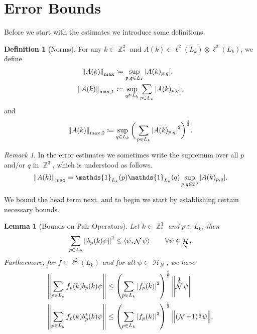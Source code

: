 \documentclass[sn-mathphys, Numbered ,a4paper]{sn-jnl}%
\DeclareMathOperator{\Z}{\mathbb{Z}}
\DeclareMathOperator{\HH}{\mathcal{H}}
\DeclareMathOperator{\NN}{\mathcal{N}}
\newcommand{\half}{\frac{1}{2}}
\newcommand{\eva}[1]{\left\langle #1 \right\rangle}
\theoremstyle{plain}
\newtheorem{lemma}[theorem]{Lemma}
\theoremstyle{definition}
\newtheorem{definition}[theorem]{Definition}
\theoremstyle{remark}
\newtheorem{remark}[theorem]{Remark}
\theoremstyle{plain}
\theoremstyle{definition}
\theoremstyle{remark}
\begin{document}
\section{Error Bounds}\label{subsec3}
 Before we start with the estimates we introduce some definitions.
\begin{definition}[Norms]
	For any $k \in \Z^3_*$ and $A(k)\in \ell^2(L_k)\otimes \ell^2(L_k)$, we define
	\begin{align}
		\norm{A(k)}_{\mathrm{max}} &\coloneq \sup\limits_{p,q \in L_k}\abs{A(k)_{p,q}},\\
		\norm{A(k)}_{\mathrm{max,1}} &\coloneq \sup\limits_{q \in L_k}\sum\limits_{p \in L_k}\abs{A(k)_{p,q}},
	\end{align}
	and
	\begin{equation}
		\norm{A(k)}_{\mathrm{max},2} \coloneq \sup\limits_{q \in L_k}\bigg(\sum\limits_{p \in L_k}\abs{A(k)_{p,q}}^2\bigg)^\half.
	\end{equation}
\end{definition}
\begin{remark}
	In the error estimates we sometimes write the supremum over all $p$ and/or $q$ in $\Z^3$, which is understood as follows.
	\begin{equation}
		\norm{A(k)}_{\mathrm{max}} = \mathds{1}_{L_k}(p)\mathds{1}_{L_k}(q) \sup\limits_{p,q \in \Z^3}\abs{A(k)_{p,q}}.
	\end{equation} 
		
	\end{remark}	
We bound the head term next, and to begin we start by establishing certain necessary bounds.    
\begin{lemma}[Bounds on Pair Operators]\label{lem:pairest}
    Let $k \in \Z^3_*$ and $p \in L_k$, then
    \begin{equation}\label{eq:estopb}
        \sum\limits_{p \in L_k}\norm{b_p(k)\psi}^2 \leq  \eva{\psi, \NN\psi} \quad \quad \forall \psi \in \HH_N .
    \end{equation}
    Furthermore, for $f \in \ell^2(L_k)$ and for all $\psi \in \HH_N$, we have
    \begin{align}
        \norm{\sum\limits_{p\in L_k}f_p(k)b_p(k)\psi}&\leq \left(\sum\limits_{p \in L_{k}}\left|f_p(k)\right|^2\right)^\half \norm{\NN^\half\psi}\label{eq:estb}\\
        \norm{\sum\limits_{p\in L_k}f_p(k)b^*_p(k)\psi}&\leq \left(\sum\limits_{p \in L_{k}}\left|f_p(k)\right|^2\right)^\half \norm{(\NN+1)^\half\psi}.\label{eq:estb*}
    \end{align}
\end{lemma}
\end{document}
